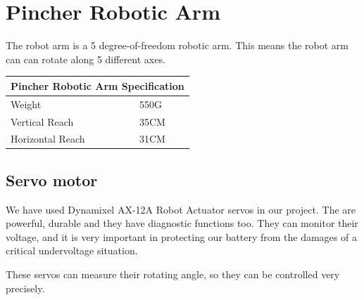 	\section{Pincher Robotic Arm}
	
		\hspace{15pt}The robot arm is a 5 degree-of-freedom robotic arm. This means the robot arm can can rotate along 5 different axes. \cite{arduino1}
		
		\begin{table}[ht]
			\begin{tabular}{|l|l|}
				\hline
				\multicolumn{2}{|l|}{\textbf{Pincher Robotic Arm Specification}} \\ \hline
				Weight                                & 550G                     \\ \hline
				Vertical Reach                        & 35CM                     \\ \hline
				Horizontal Reach                      & 31CM                     \\ \hline
			\end{tabular}
		\end{table}
		
		\subsection{Servo motor}
	
			\hspace{15pt}We have used Dynamixel AX-12A Robot Actuator servos in our project. The are powerful, durable and they have diagnostic functions too. They can monitor their voltage, and it is very important in protecting our battery from the damages of a critical undervoltage situation.

			These servos can measure their rotating angle, so they can be controlled very precisely. \cite{robot_servo}
			
